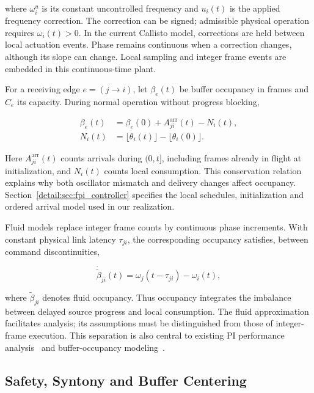 where $\omega_i^u$ is its constant uncontrolled frequency and $u_i(t)$ is the applied frequency correction. The correction can be signed; admissible physical operation requires $\omega_i(t)>0$. In the current Callisto model, corrections are held between local actuation events. Phase remains continuous when a correction changes, although its slope can change. Local sampling and integer frame events are embedded in this continuous-time plant.

For a receiving edge $e=(j\to i)$, let $\beta_e(t)$ be buffer occupancy in frames and $C_e$ its capacity. During normal operation without progress blocking,

\begin{align}
\beta_e(t)&=\beta_e(0)+A_{ji}^{\mathrm{arr}}(t)-N_i(t),\nonumber\\
N_i(t)&=\lfloor\theta_i(t)\rfloor-\lfloor\theta_i(0)\rfloor.
\label{detail:eq:bg_count_balance}
\end{align}

Here $A_{ji}^{\mathrm{arr}}(t)$ counts arrivals during $(0,t]$, including frames already in flight at initialization, and $N_i(t)$ counts local consumption. This conservation relation explains why both oscillator mismatch and delivery changes affect occupancy. Section~\ref{detail:sec:fpi_controller} specifies the local schedules, initialization and ordered arrival model used in our realization.

Fluid models replace integer frame counts by continuous phase increments. With constant physical link latency $\tau_{ji}$, the corresponding occupancy satisfies, between command discontinuities,

\begin{equation}
\dot{\widetilde\beta}_{ji}(t)
=\omega_j(t-\tau_{ji})-\omega_i(t),
\end{equation}

where $\widetilde\beta_{ji}$ denotes fluid occupancy. Thus occupancy integrates the imbalance between delayed source progress and local consumption. The fluid approximation facilitates analysis; its assumptions must be distinguished from those of integer-frame execution. This separation is also central to existing PI performance analysis~\cite{lall2022resistance} and buffer-occupancy modeling~\cite{lall2024bufferOccupancy}.

\subsection{Safety, Syntony and Buffer Centering}

